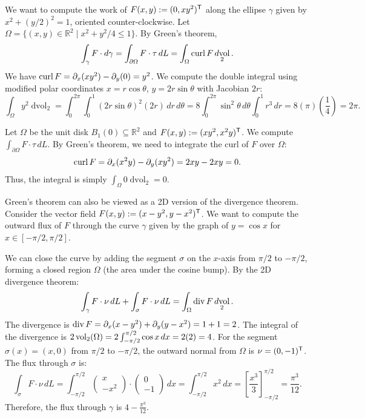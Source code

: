 \begin{example}
\label{ex:line_integral_greens}
We want to compute the work of $F(x,y) := (0, xy^2)^{\mathsf{T}}$ along the ellipse $\gamma$ given by $x^2 + (y/2)^2 = 1$, oriented counter-clockwise.
Let $\Omega = \{(x,y) \in \mathbb{R}^2 \mid x^2 + y^2/4 \leq 1\}$. By Green's theorem,
\[\int_\gamma F \cdot d\gamma = \int_{\partial\Omega} F \cdot \tau \,dL = \int_\Omega \operatorname{curl} F \mathop{d\text{vol}}_2.\]
We have $\operatorname{curl} F = \partial_x(xy^2) - \partial_y(0) = y^2$. We compute the double integral using modified polar coordinates $x = r \cos \theta$, $y = 2r \sin \theta$ with Jacobian $2r$:
\[\int_\Omega y^2 \mathop{d\text{vol}}_2 = \int_0^{2\pi} \int_0^1 (2r \sin\theta)^2 (2r) \,dr\,d\theta = 8 \int_0^{2\pi} \sin^2\theta \,d\theta \int_0^1 r^3 \,dr = 8 (\pi) \left(\frac{1}{4}\right) = 2\pi.\]
\end{example}

\begin{example}
\label{ex:curl_free_greens}
Let $\Omega$ be the unit disk $B_1(0) \subseteq \mathbb{R}^2$ and $F(x,y) := (xy^2, x^2y)^{\mathsf{T}}$. We compute $\int_{\partial\Omega} F \cdot \tau \,dL$.
By Green's theorem, we need to integrate the curl of $F$ over $\Omega$:
\[\operatorname{curl} F = \partial_x(x^2y) - \partial_y(xy^2) = 2xy - 2xy = 0.\]
Thus, the integral is simply $\int_\Omega 0 \mathop{d\text{vol}}_2 = 0$.
\end{example}

\begin{example}
\label{ex:2d_divergence_theorem}
Green's theorem can also be viewed as a 2D version of the divergence theorem. Consider the vector field $F(x,y) := (x - y^2, y - x^2)^{\mathsf{T}}$. We want to compute the outward flux of $F$ through the curve $\gamma$ given by the graph of $y = \cos x$ for $x \in [-\pi/2, \pi/2]$.

We can close the curve by adding the segment $\sigma$ on the $x$-axis from $\pi/2$ to $-\pi/2$, forming a closed region $\Omega$ (the area under the cosine bump). By the 2D divergence theorem:
\[\int_{\gamma} F \cdot \nu \,dL + \int_{\sigma} F \cdot \nu \,dL = \int_\Omega \operatorname{div} F \mathop{d\text{vol}}_2.\]
The divergence is $\operatorname{div} F = \partial_x(x-y^2) + \partial_y(y-x^2) = 1 + 1 = 2$.
The integral of the divergence is $2 \operatorname{vol}_2(\Omega) = 2 \int_{-\pi/2}^{\pi/2} \cos x \,dx = 2(2) = 4$.
For the segment $\sigma(x) = (x, 0)$ from $\pi/2$ to $-\pi/2$, the outward normal from $\Omega$ is $\nu = (0, -1)^{\mathsf{T}}$. The flux through $\sigma$ is:
\[\int_{\sigma} F \cdot \nu \,dL = \int_{-\pi/2}^{\pi/2} \begin{pmatrix} x \\ -x^2 \end{pmatrix} \cdot \begin{pmatrix} 0 \\ -1 \end{pmatrix} \,dx = \int_{-\pi/2}^{\pi/2} x^2 \,dx = \left[ \frac{x^3}{3} \right]_{-\pi/2}^{\pi/2} = \frac{\pi^3}{12}.\]
Therefore, the flux through $\gamma$ is $4 - \frac{\pi^3}{12}$.
\end{example}


